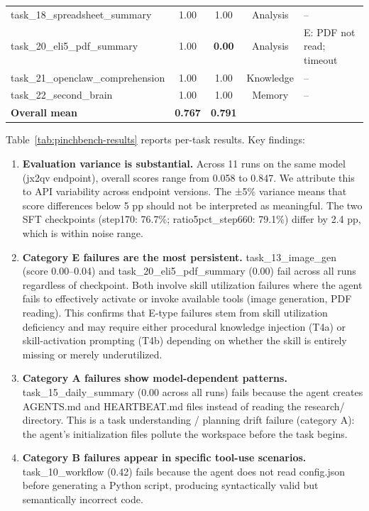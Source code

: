 \begin{table}[t]
{\begin{tabular}{lcccl}
task\_18\_spreadsheet\_summary & 1.00 & 1.00 & Analysis & -- \\
task\_20\_eli5\_pdf\_summary & 1.00 & \textbf{0.00} & Analysis & E: PDF not read; timeout \\
task\_21\_openclaw\_comprehension & 1.00 & 1.00 & Knowledge & -- \\
task\_22\_second\_brain & 1.00 & 1.00 & Memory & -- \\
\midrule
\textbf{Overall mean} & \textbf{0.767} & \textbf{0.791} & & \\
\bottomrule
\end{tabular}}
\end{table}

Table~\ref{tab:pinchbench-results} reports per-task results. Key findings:

\begin{enumerate}[leftmargin=2em, label=(\alph*), itemsep=1pt]

  \item \textbf{Evaluation variance is substantial.} Across 11 runs on the same model (jx2qv endpoint), overall scores range from 0.058 to 0.847. We attribute this to API variability across endpoint versions. The ±5\% variance means that score differences below 5 pp should not be interpreted as meaningful. The two SFT checkpoints (step170: 76.7\%; ratio5pct\_step660: 79.1\%) differ by 2.4 pp, which is within noise range.

  \item \textbf{Category E failures are the most persistent.} task\_13\_image\_gen (score 0.00--0.04) and task\_20\_eli5\_pdf\_summary (0.00) fail across all runs regardless of checkpoint. Both involve skill utilization failures where the agent fails to effectively activate or invoke available tools (image generation, PDF reading). This confirms that E-type failures stem from skill utilization deficiency and may require either procedural knowledge injection (T4a) or skill-activation prompting (T4b) depending on whether the skill is entirely missing or merely underutilized.

  \item \textbf{Category A failures show model-dependent patterns.} task\_15\_daily\_summary (0.00 across all runs) fails because the agent creates AGENTS.md and HEARTBEAT.md files instead of reading the research/ directory. This is a task understanding / planning drift failure (category A): the agent's initialization files pollute the workspace before the task begins.

  \item \textbf{Category B failures appear in specific tool-use scenarios.} task\_10\_workflow (0.42) fails because the agent does not read config.json before generating a Python script, producing syntactically valid but semantically incorrect code.


\end{enumerate}
